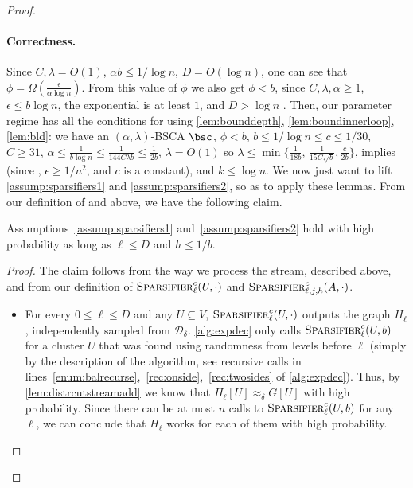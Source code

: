 \begin{proof}
	\paragraph{Correctness.} Since $C,\lambda = O(1)$, $\alpha b \le 1/\log n$, $D = O(\log n)$, one can see that $\phi= \Omega(\frac{\epsilon}{\alpha \log n})$. From this value of $\phi$ we also get $\phi < b$, since $C,\lambda,\alpha \ge 1$, $\epsilon \le b \log n$, the exponential is at least $1$, and $D > \log n$ . Then, our parameter regime has all the conditions for using \cref{lem:bounddepth}, \cref{lem:boundinnerloop}, \cref{lem:bld}: we have an $(\alpha,\lambda)$-BSCA $\bsc$, $\phi < b$, $b \le 1/\log n \le c \le 1/30$, $C \ge 31$, $\alpha \le \frac{1}{b \log n} \le \frac{1}{144C \lambda b} \le \frac{1}{2b}$, $\lambda = O(1)$ so $\lambda \le \min\{\frac{1}{18b}, \, \frac{1}{15C\sqrt{b}}, \frac{c}{2b}\}$,   implies  (since , $\epsilon \ge 1/n^2$, and $c$ is a constant), and $k \le \log n$. We now just want to lift \cref{assump:sparsifiers1} and \cref{assump:sparsifiers2}, so as to apply these lemmas. From our definition of  and  above, we have the following claim.
	\begin{claim}
		\label{claim:lift}
		Assumptions~\ref{assump:sparsifiers1} and~\ref{assump:sparsifiers2} hold with high probability as long as $\ell \le D$ and $h \le 1/b$.
	\end{claim}
	\begin{proof}
		The claim follows from the way we process the stream, described above, and from our definition of $\textsc{Sparsifier}^c_\ell(U,\cdot)$ and $\textsc{Sparsifier}^c_{\ell,j,h}(A,\cdot)$.
		\begin{itemize}
			\item For every $0 \le \ell \le D$ and any $U \subseteq V$, $\textsc{Sparsifier}^c_\ell(U,\cdot)$ outputs the graph $H_\ell$, independently sampled from $\mathcal{D}_\delta$.  \cref{alg:expdec} only calls $\textsc{Sparsifier}^c_\ell(U,b)$ for a cluster $U$ that was found using randomness from levels before $\ell$ (simply by the description of the algorithm, see recursive calls in lines~\eqref{enum:balrecurse},~\eqref{rec:onside},~\eqref{rec:twosides} of \cref{alg:expdec}). Thus, by \cref{lem:distrcutstreamadd} we know that $H_\ell[U] \approx_\delta G[U]$ with high probability. Since there can be at most $n$ calls to $\textsc{Sparsifier}^c_\ell(U,b)$ for any $\ell$, we can conclude that $H_\ell$ works for each of them with high probability.

\end{itemize}
\end{proof}
\end{proof}
